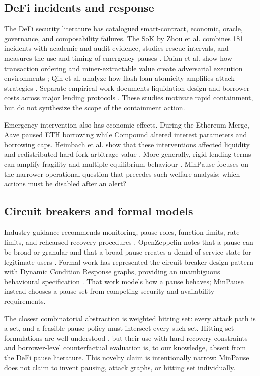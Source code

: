 \documentclass[sn-vancouver,Numbered]{sn-jnl}
\begin{document}
\subsection{DeFi incidents and response}
The DeFi security literature has catalogued smart-contract, economic, oracle, governance, and composability failures. The SoK by Zhou et al. combines 181 incidents with academic and audit evidence, studies rescue intervals, and measures the use and timing of emergency pauses \cite{zhou2023sok}. Daian et al. show how transaction ordering and miner-extractable value create adversarial execution environments \cite{daian2020flash}; Qin et al. analyze how flash-loan atomicity amplifies attack strategies \cite{qin2021flashloans}. Separate empirical work documents liquidation design and borrower costs across major lending protocols \cite{qin2021liquidations}. These studies motivate rapid containment, but do not synthesize the scope of the containment action.

Emergency intervention also has economic effects.  During the Ethereum Merge, Aave paused ETH borrowing while Compound altered interest parameters and borrowing caps.  Heimbach et al. show that these interventions affected liquidity and redistributed hard-fork-arbitrage value \cite{heimbach2023merge}.  More generally, rigid lending terms can amplify fragility and multiple-equilibrium behaviour \cite{chiu2025fragility}.  MinPause focuses on the narrower operational question that precedes such welfare analysis: which actions must be disabled after an alert?

\subsection{Circuit breakers and formal models}
Industry guidance recommends monitoring, pause roles, function limits, rate limits, and rehearsed recovery procedures \cite{openzeppelin2023ir,owasp2026recovery}.  OpenZeppelin notes that a pause can be broad or granular and that a broad pause creates a denial-of-service state for legitimate users \cite{openzeppelin2023ir}.  Formal work has represented the circuit-breaker design pattern with Dynamic Condition Response graphs, providing an unambiguous behavioural specification \cite{eshghie2026dcr}.  That work models how a pause behaves; MinPause instead chooses a pause set from competing security and availability requirements.

The closest combinatorial abstraction is weighted hitting set: every attack path is a set, and a feasible pause policy must intersect every such set.  Hitting-set formulations are well understood \cite{vazirani2001approximation}, but their use with hard recovery constraints and borrower-level counterfactual evaluation is, to our knowledge, absent from the DeFi pause literature.  This novelty claim is intentionally narrow: MinPause does not claim to invent pausing, attack graphs, or hitting set individually.
\end{document}
